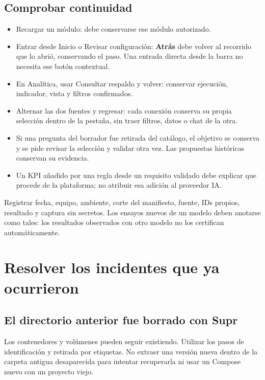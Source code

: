 \documentclass[
  spanish,
  10pt,
  a4paper,
]{article}
\providecommand{\tightlist}{%
  \setlength{\itemsep}{0pt}\setlength{\parskip}{0pt}}
\begin{document}
\subsection{Comprobar continuidad}\label{comprobar-continuidad}

\begin{itemize}
\tightlist
\item
  Recargar un módulo: debe conservarse ese módulo autorizado.
\item
  Entrar desde Inicio o Revisar configuración: \textbf{Atrás} debe
  volver al recorrido que lo abrió, conservando el paso. Una entrada
  directa desde la barra no necesita ese botón contextual.
\item
  En Analítica, usar Consultar respaldo y volver: conservar ejecución,
  indicador, vista y filtros confirmados.
\item
  Alternar las dos fuentes y regresar: cada conexión conserva su propia
  selección dentro de la pestaña, sin traer filtros, datos o chat de la
  otra.
\item
  Si una pregunta del borrador fue retirada del catálogo, el objetivo se
  conserva y se pide revisar la selección y validar otra vez. Las
  propuestas históricas conservan su evidencia.
\item
  Un KPI añadido por una regla desde un requisito validado debe explicar
  que procede de la plataforma; no atribuir esa adición al proveedor IA.
\end{itemize}

Registrar fecha, equipo, ambiente, corte del manifiesto, fuente, IDs
propios, resultado y captura sin secretos. Los ensayos nuevos de un
modelo deben anotarse como tales: los resultados observados con otro
modelo no los certifican automáticamente.

\clearpage

\section{Resolver los incidentes que ya
ocurrieron}\label{resolver-los-incidentes-que-ya-ocurrieron}

\subsection{El directorio anterior fue borrado con
Supr}\label{el-directorio-anterior-fue-borrado-con-supr}

Los contenedores y volúmenes pueden seguir existiendo. Utilizar los
pasos de identificación y retirada por etiquetas. No extraer una versión
nueva dentro de la carpeta antigua desaparecida para intentar
recuperarla ni usar un Compose nuevo con un proyecto viejo.
\end{document}
